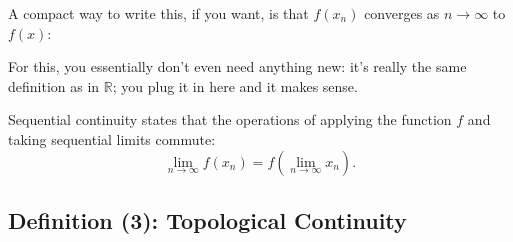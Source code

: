 \begin{speech}[01:05:40 - 01:06:11]
A compact way to write this, if you want, is that $f(x_n)$ converges as $n \to \infty$ to $f(x)$: 

For this, you essentially don't even need anything new: it's really the same definition as in $\mathbb{R}$; you plug it in here and it makes sense.
\end{speech}

\begin{hidden}
\end{hidden}

\begin{content}

\begin{steps}
Sequential continuity states that the operations of applying the function $f$ and taking sequential limits commute:
\[
\lim_{n \to \infty} f(x_n) = f\left( \lim_{n \to \infty} x_n \right).
\]
\end{steps}
\end{content}

\subsection{Definition (3): Topological Continuity}

